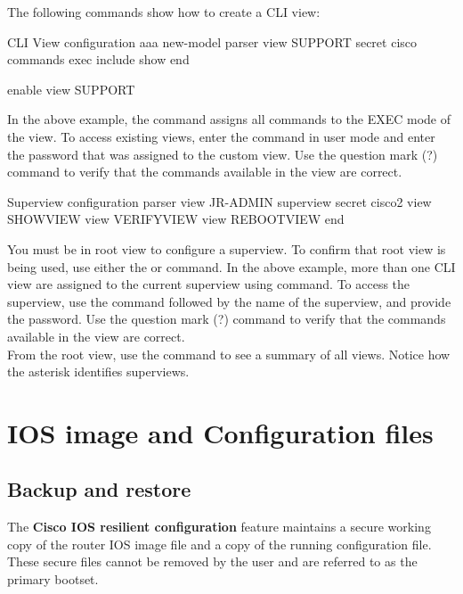 The following commands show how to create a CLI view:

\begin{sexylisting}{CLI View configuration}
aaa new-model
parser view SUPPORT
  secret cisco
  commands exec include show
end

enable view SUPPORT
\end{sexylisting}

In the above example, the  command assigns all  commands to the EXEC mode of the view. To access existing views, enter the  command in user mode and enter the password that was assigned to the custom view. Use the question mark (?) command to verify that the commands available in the view are correct.

\begin{sexylisting}{Superview configuration}
parser view JR-ADMIN superview
  secret cisco2
  view SHOWVIEW
  view VERIFYVIEW
  view REBOOTVIEW
end
\end{sexylisting}

You must be in root view to configure a superview. To confirm that root view is being used, use either the  or  command. In the above example, more than one CLI view are assigned to the current superview using  command. To access the superview, use the  command followed by the name of the superview, and provide the password. Use the question mark (?) command to verify that the commands available in the view are correct.\\

From the root view, use the  command to see a summary of all views. Notice how the asterisk identifies superviews.

\section{IOS image and Configuration files}

\subsection{Backup and restore}

The \textbf{Cisco IOS resilient configuration} feature maintains a secure working copy of the router IOS image file and a copy of the running configuration file. These secure files cannot be removed by the user and are referred to as the primary bootset.\\

